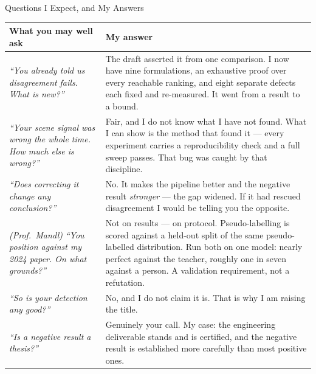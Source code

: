 \documentclass[aspectratio=169,11pt]{beamer}
\begin{document}
\begin{frame}{Questions I Expect, and My Answers}
\tiny
\begin{center}
\begin{tabular}{@{}p{5.0cm} p{7.4cm}@{}}
\toprule
\textbf{What you may well ask} & \textbf{My answer} \\
\midrule
\emph{``You already told us disagreement fails. What is new?''} & The draft asserted it from one comparison. I now have nine formulations, an exhaustive proof over every reachable ranking, and eight separate defects each fixed and re-measured. It went from a result to a bound. \\
\addlinespace
\emph{``Your scene signal was wrong the whole time. How much else is wrong?''} & Fair, and I do not know what I have not found. What I can show is the method that found it --- every experiment carries a reproducibility check and a full sweep passes. That bug was caught by that discipline. \\
\addlinespace
\emph{``Does correcting it change any conclusion?''} & No. It makes the pipeline better and the negative result \emph{stronger} --- the gap widened. If it had rescued disagreement I would be telling you the opposite. \\
\addlinespace
\emph{(Prof.\ Mandl)} \emph{``You position against my 2024 paper. On what grounds?''} & Not on results --- on protocol. Pseudo-labelling is scored against a held-out split of the same pseudo-labelled distribution. Run both on one model: nearly perfect against the teacher, roughly one in seven against a person. A validation requirement, not a refutation. \\
\addlinespace
\emph{``So is your detection any good?''} & No, and I do not claim it is. That is why I am raising the title. \\
\addlinespace
\emph{``Is a negative result a thesis?''} & Genuinely your call. My case: the engineering deliverable stands and is certified, and the negative result is established more carefully than most positive ones. \\
\bottomrule
\end{tabular}
\end{center}
\end{frame}
\end{document}
